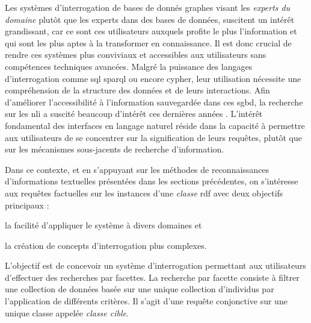 Les systèmes d'interrogation de bases de donnés graphes visant les \emph{experts du domaine} plutôt que les experts dans des bases de données, suscitent un intérêt grandissant, car ce sont ces utilisateurs auxquels profite le plus l'information et qui sont les plus aptes à la transformer en connaissance.
Il est donc crucial de rendre ces systèmes plus conviviaux et accessibles aux utilisateurs sans compétences techniques avancées.
Malgré la puissance des langages d'interrogation comme \gls{sql} \gls{sparql} ou encore \gls{cypher}, leur utilisation nécessite une compréhension de la structure des données et de leurs interactions.
Afin d'améliorer l'accessibilité à l'information sauvegardée dans ces \gls{sgbd}, la recherche sur les \gls{nli} a suscité beaucoup d'intérêt ces dernières années \cite{zhengQuestionAnsweringKnowledge2018,wangCrossdomainNaturalLanguage2019}.
L'intérêt fondamental des interfaces en langage naturel réside dans la capacité à permettre aux utilisateurs de se concentrer sur la signification de leurs requêtes, plutôt que sur les mécanismes sous-jacents de recherche d'information.

Dans ce contexte, et en s'appuyant sur les méthodes de reconnaissances d'informations textuelles présentées dans les sections précédentes, on s'intéresse aux requêtes factuelles sur les instances d'une \emph{classe} \gls{rdf} avec deux objectifs principaux :
\begin{enumerate*}[label=(\roman*)]
    \item la facilité d'appliquer le système à divers domaines et
    \item la création de concepts d'interrogation plus complexes.
\end{enumerate*}
L'objectif est de concevoir un système d'interrogation permettant aux utilisateurs d'effectuer des recherches par facettes.
La recherche par facette consiste à filtrer une collection de données basée sur une unique collection d'individus par l'application de différents critères.
Il s'agit d'une requête conjonctive sur une unique classe appelée \emph{classe cible}.

